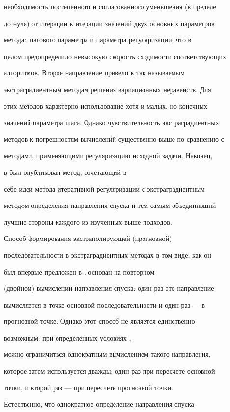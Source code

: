 необходимость постепенного и согласованного уменьшения (в пределе


до нуля) от итерации к итерации значений двух основных параметров


метода: шагового параметра и параметра регуляризации, что в


целом предопределило невысокую скорость сходимости соответствующих


алгоритмов. Второе направление привело к так называемым


экстраградиентным методам решения вариационных неравенств. Для


этих методов характерно использование хотя и малых, но конечных


значений параметра шага. Однако чувствительность экстраградиентных


методов к погрешностям вычислений существенно выше по сравнению с


методами, применяющими регуляризацию исходной задачи. Наконец,


в \cite{ant1} был опубликован метод, сочетающий в


себе идеи метода итеративной регуляризации с экстраградиентным


методoм определения направления спуска и тем самым объединивший


лучшие стороны каждого из изученных выше подходов.





Способ формирования экстраполирующей (прогнозной)


последовательности в экстраградиентных методах в том виде, как он


был впервые предложен в \cite{korpel}, основан на повторном


(двойном) вычислении направления спуска: один раз это направление


вычисляется в точке основной последовательности и один раз --- в


прогнозной точке. Однако этот способ не является единственно


возможным: при определенных условиях \cite{ppf1}, \cite{ppf2}


можно ограничиться однократным вычислением такого направления,


которое затем используется дважды: один раз при пересчете основной


точки, и второй раз --- при пересчете прогнозной точки.


Естественно, что однократное определение направления спуска


